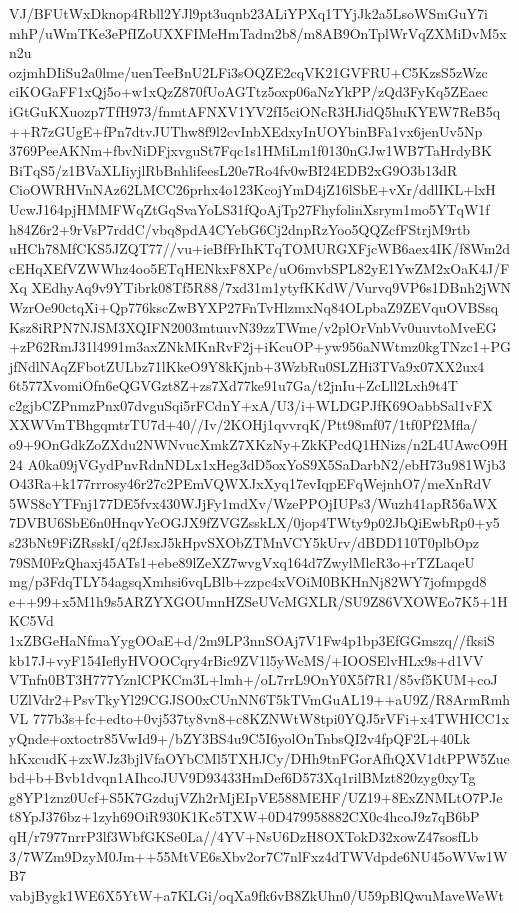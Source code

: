 {{VJ/BFUtWxDknop4Rbll2YJl9pt3uqnb23ALiYPXq1TYjJk2a5LsoWSmGuY7i
mhP/uWmTKe3ePfIZoUXXFIMeHmTadm2b8/m8AB9OnTplWrVqZXMiDvM5xn2u
ozjmhDIiSu2a0lme/uenTeeBnU2LFi3sOQZE2cqVK21GVFRU+C5KzsS5zWzc
ciKOGaFF1xQj5o+w1xQzZ870fUoAGTtz5oxp06aNzYkPP/zQd3FyKq5ZEaec
iGtGuKXuozp7TfH973/fnmtAFNXV1YV2fI5ciONcR3HJidQ5huKYEW7ReB5q
++R7zGUgE+fPn7dtvJUThw8f9l2cvInbXEdxyInUOYbinBFa1vx6jenUv5Np
3769PeeAKNm+fbvNiDFjxvguSt7Fqc1s1HMiLm1f0130nGJw1WB7TaHrdyBK
BiTqS5/z1BVaXLIiyjlRbBnhlifeesL20e7Ro4fv0wBI24EDB2xG9O3b13dR
CioOWRHVnNAz62LMCC26prhx4o123KcojYmD4jZ16lSbE+vXr/ddlIKL+lxH
UcwJ164pjHMMFWqZtGqSvaYoLS31fQoAjTp27FhyfolinXsrym1mo5YTqW1f
h84Z6r2+9rVsP7rddC/vbq8pdA4CYebG6Cj2dnpRzYoo5QQZcfFStrjM9rtb
uHCh78MfCKS5JZQT77//vu+ieBfFrIhKTqTOMURGXFjcWB6aex4IK/f8Wm2d
cEHqXEfVZWWhz4oo5ETqHENkxF8XPc/uO6mvbSPL82yE1YwZM2xOaK4J/FXq
XEdhyAq9v9YTibrk08Tf5R88/7xd31m1ytyfKKdW/Vurvq9VP6s1DBnh2jWN
WzrOe90ctqXi+Qp776kscZwBYXP27FnTvHlzmxNq84OLpbaZ9ZEVquOVBSsq
Ksz8iRPN7NJSM3XQIFN2003mtuuvN39zzTWme/v2plOrVnbVv0uuvtoMveEG
+zP62RmJ31l4991m3axZNkMKnRvF2j+iKcuOP+yw956aNWtmz0kgTNzc1+PG
jfNdlNAqZFbotZULbz71lKkeO9Y8kKjnb+3WzbRu0SLZHi3TVa9x07XX2ux4
6t577XvomiOfn6eQGVGzt8Z+zs7Xd77ke91u7Ga/t2jnIu+ZcLll2Lxh9t4T
c2gjbCZPnmzPnx07dvguSqi5rFCdnY+xA/U3/i+WLDGPJfK69OabbSal1vFX
XXWVmTBhgqmtrTU7d+40//Iv/2KOHj1qvvrqK/Ptt98mf07/1tf0Pf2Mfla/
o9+9OnGdkZoZXdu2NWNvucXmkZ7XKzNy+ZkKPcdQ1HNizs/n2L4UAwcO9H24
A0ka09jVGydPnvRdnNDLx1xHeg3dD5oxYoS9X5SaDarbN2/ebH73u981Wjb3
O43Ra+k177rrrosy46r27c2PEmVQWXJxXyq17evIqpEFqWejnhO7/meXnRdV
5WS8cYTFnj177DE5fvx430WJjFy1mdXv/WzePPOjIUPs3/Wuzh41apR56aWX
7DVBU6SbE6n0HnqvYcOGJX9fZVGZsskLX/0jop4TWty9p02JbQiEwbRp0+y5
s23bNt9FiZRsskI/q2fJsxJ5kHpvSXObZTMnVCY5kUrv/dBDD110T0plbOpz
79SM0FzQhaxj45ATs1+ebe89lZeXZ7wvgVxq164d7ZwylMlcR3o+rTZLaqeU
mg/p3FdqTLY54agsqXmhsi6vqLBlb+zzpc4xVOiM0BKHnNj82WY7jofmpgd8
e++99+x5M1h9s5ARZYXGOUmnHZSeUVcMGXLR/SU9Z86VXOWEo7K5+1HKC5Vd
1xZBGeHaNfmaYygOOaE+d/2m9LP3nnSOAj7V1Fw4p1bp3EfGGmszq//fksiS
kb17J+vyF154IeflyHVOOCqry4rBic9ZV1l5yWcMS/+IOOSElvHLx9s+d1VV
VTnfn0BT3H777YznlCPKCm3L+lmh+/oL7rrL9OnY0X5f7R1/85vf5KUM+coJ
UZlVdr2+PsvTkyYl29CGJSO0xCUnNN6T5kTVmGuAL19++aU9Z/R8ArmRmhVL
777b3s+fc+edto+0vj537ty8vn8+c8KZNWtW8tpi0YQJ5rVFi+x4TWHICC1x
yQnde+oxtoctr85VwId9+/bZY3BS4u9C5I6yolOnTnbsQI2v4fpQF2L+40Lk
hKxcudK+zxWJz3bjlVfaOYbCMl5TXHJCy/DHh9tnFGorAfhQXV1dtPPW5Zue
bd+b+Bvb1dvqn1AIhcoJUV9D93433HmDef6D573Xq1rilBMzt820zyg0xyTg
g8YP1znz0Ucf+S5K7GzdujVZh2rMjEIpVE588MEHF/UZ19+8ExZNMLtO7PJe
t8YpJ376bz+1zyh69OiR930K1Kc5TXW+0D479958882CX0c4hcoJ9z7qB6bP
qH/r7977nrrP3lf3WbfGKSe0La//4YV+NsU6DzH8OXTokD32xowZ47sosfLb
3/7WZm9DzyM0Jm++55MtVE6sXbv2or7C7nlFxz4dTWVdpde6NU45oWVw1WB7
vabjBygk1WE6X5YtW+a7KLGi/oqXa9fk6vB8ZkUhn0/U59pBlQwuMaveWeWt
}}
